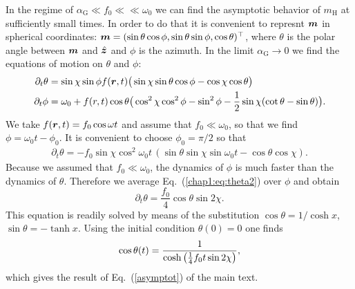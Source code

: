 In the regime of $\alpha_\textrm{G}\ll f_0 \ll \ll \omega_0$ we can find the asymptotic behavior of $m_\textrm{H}$ at sufficiently small times. In order to do that it is convenient to represnt $\boldsymbol{m}$ in spherical coordinates: $\boldsymbol{m}=(\sin\theta\cos\phi,\sin\theta\sin\phi,\cos\theta)^\top$, where $\theta$ is the polar angle between $\boldsymbol{m}$ and $\hat{\boldsymbol{z}}$ and $\phi$ is the azimuth. In the limit $\alpha_\textrm{G}\rightarrow 0$ we find the equations of motion on $\theta$ and $\phi$:
\begin{align}
\partial_t \theta &= \sin \chi  \sin \phi  f(\boldsymbol{r},t) \big(\sin \chi  \sin \theta \cos \phi -\cos \chi  \cos \theta \big)\\
\partial_t \phi &=\omega_0+f(r,t) 
  \cos\theta\big(\cos ^2\chi  \cos ^2\phi-\sin^2\phi -\frac{1}{2}\sin\chi(\cot\theta-\sin\theta) \big).
\end{align}
We take $f(\boldsymbol{r},t)=f_0\cos\omega t$ and assume that $f_0\ll\omega_0$, so that we find $\phi = \omega_0 t-\phi_0$. It is convenient to choose $\phi_0=\pi/2$ so that
\begin{align}
  \partial_t \theta = -f_0 \sin \chi  \cos ^2\omega_0t\,(\sin \theta  \sin \chi  \sin \omega_0t-\cos \theta  \cos \chi ).
  \label{chap1:eq:theta2}
\end{align}
Because we assumed that $f_0\ll\omega_0$, the dynamics of $\phi$ is much faster than the dynamics of $\theta$. Therefore we average Eq.~(\ref{chap1:eq:theta2}) over $\phi$ and obtain
\begin{equation}
  \partial_t\theta = \frac{f_0}{4} \cos \theta \sin2\chi.
\end{equation}
This equation is readily solved by means of the substitution $\cos\theta = 1/\cosh x$, $\sin\theta=-\tanh x$. Using the initial condition $\theta(0)=0$ one finds 
\begin{equation}
\cos\theta(t) = \frac{1}{\cosh\left( \frac{1}{4}f_0 t \sin2\chi\right)},
\end{equation}
which gives the result of Eq.~(\ref{asymptot}) of the main text.

